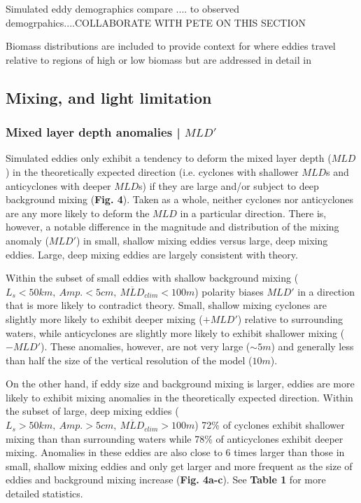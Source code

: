 \documentclass{article}
\begin{document}
Simulated eddy demographics compare .... to observed demogrpahics....COLLABORATE WITH PETE ON THIS SECTION

Biomass distributions are included to provide context for where eddies travel relative to regions of high or low biomass but are addressed in detail in \parencite{RohrEddyInducedVariabilityinprep.}



\subsection{Mixing, and light limitation}

\subsubsection{Mixed layer depth anomalies | $MLD'$}

Simulated eddies only exhibit a tendency to deform the mixed layer depth ($MLD$) in the theoretically expected direction (i.e. cyclones with shallower $MLD$s and anticyclones with deeper $MLD$s) if they are large and/or subject to deep background mixing (\textbf{Fig. 4}). Taken as a whole, neither cyclones nor anticyclones are any more likely to deform the $MLD$ in a particular direction. There is, however, a notable difference in the magnitude and distribution of the mixing anomaly ($MLD'$) in small, shallow mixing eddies versus large, deep mixing eddies. Large, deep mixing eddies are largely consistent with theory. 

Within the subset of small eddies with shallow background mixing ($L_s<50km, \ Amp.<5cm, \ \overline{MLD}_{clim}<100m$) polarity biases $MLD'$ in a direction that is more likely to contradict theory. Small, shallow mixing cyclones are slightly more likely to exhibit deeper mixing ($+MLD'$) relative to surrounding waters, while anticyclones are slightly more likely to exhibit shallower mixing ($-MLD'$). These anomalies, however, are not very large ($\sim5 m$) and generally less than half the size of the vertical resolution of the model ($10m$).

On the other hand, if eddy size and background mixing is larger, eddies are more likely to exhibit mixing anomalies in the theoretically expected direction. Within the subset of large, deep mixing eddies ($L_s>50km, \ Amp.>5cm, \ \overline{MLD}_{clim}>100m$) 72\% of cyclones exhibit shallower mixing than than surrounding waters while 78\% of anticyclones exhibit deeper mixing. Anomalies in these eddies are also close to 6 times larger than those in small, shallow mixing eddies and only get larger and more frequent as the size of eddies and background mixing increase (\textbf{Fig. 4a-c}). See \textbf{Table 1} for more detailed statistics. 
\end{document}
